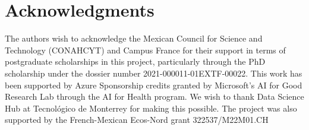 \documentclass[a4paper,fleqn]{cas-dc}
\begin{document}
\section*{Acknowledgments}

The authors wish to acknowledge the Mexican Council for Science and Technology (CONAHCYT) and Campus France for their support in terms of postgraduate scholarships in this project, particularly through the PhD scholarship under the dossier number 2021-000011-01EXTF-00022. This work has been supported by Azure Sponsorship credits granted by Microsoft’s AI for Good Research Lab through the AI for Health program. We wish to thank Data Science Hub at Tecnológico de Monterrey for making this possible. The project was also supported by the French-Mexican Ecos-Nord grant  322537/M22M01.CH







\end{document}
